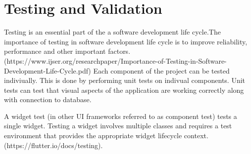 \section{Testing and Validation}
Testing is an essential part of the a software development life cycle.The importance of testing in software development life cycle is to improve reliability, performance and other important factors.(https://www.ijser.org/researchpaper/Importance-of-Testing-in-Software-
Development-Life-Cycle.pdf) Each component of the project can be tested indiviually. This is done by performing unit tests on indivual components. Unit tests can test that visual aspects of the application are working correctly along with connection to database.

A widget test (in other UI frameworks referred to as component test) tests a single widget. Testing a widget involves multiple classes and requires a test environment that provides the appropriate widget lifecycle context. (https://flutter.io/docs/testing).



 


